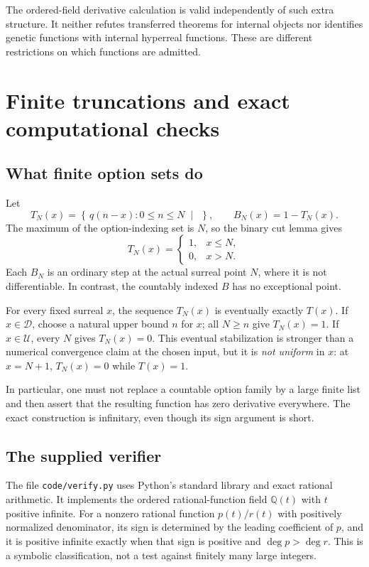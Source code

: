 \documentclass[11pt,letterpaper]{article}
\numberwithin{equation}{section}
\theoremstyle{definition}
\theoremstyle{remark}
\newcommand{\Q}{\mathbb{Q}}
\newcommand{\U}{\mathcal{U}}
\newcommand{\D}{\mathcal{D}}
\newcommand{\cut}[2]{\left\{\,#1\;\middle|\;#2\,\right\}}
\begin{document}
The ordered-field derivative calculation is valid independently of such
extra structure. It neither refutes transferred theorems for internal
objects nor identifies genetic functions with internal hyperreal
functions. These are different restrictions on which functions are
admitted.

\section{Finite truncations and exact computational checks}\label{sec:checks}
\subsection{What finite option sets do}
Let
\[
 T_N(x)=\cut{q(n-x):0\le n\le N}{},\qquad B_N(x)=1-T_N(x).
\]
The maximum of the option-indexing set is $N$, so the binary cut lemma gives
\[
 T_N(x)=\begin{cases}1,&x\le N,\\0,&x>N.\end{cases}
\]
Each $B_N$ is an ordinary step at the actual surreal point $N$, where it
is not differentiable. In contrast, the countably indexed $B$ has no
exceptional point.

For every fixed surreal $x$, the sequence $T_N(x)$ is eventually exactly
$T(x)$. If $x\in\D$, choose a natural upper bound $n$ for $x$; all
$N\ge n$ give $T_N(x)=1$. If $x\in\U$, every $N$ gives $T_N(x)=0$.
This eventual stabilization is stronger than a numerical convergence
claim at the chosen input, but it is \emph{not uniform} in $x$: at
$x=N+1$, $T_N(x)=0$ while $T(x)=1$.

In particular, one must not replace a countable option family by a large
finite list and then assert that the resulting function has zero
derivative everywhere. The exact construction is infinitary, even though
its sign argument is short.

\subsection{The supplied verifier}
The file \texttt{code/verify.py} uses Python's standard library and exact
rational arithmetic. It implements the ordered rational-function field
$\Q(t)$ with $t$ positive infinite. For a nonzero rational function
$p(t)/r(t)$ with positively normalized denominator, its sign is determined
by the leading coefficient of $p$, and it is positive infinite exactly
when that sign is positive and $\deg p>\deg r$. This is a symbolic
classification, not a test against finitely many large integers.
\end{document}
